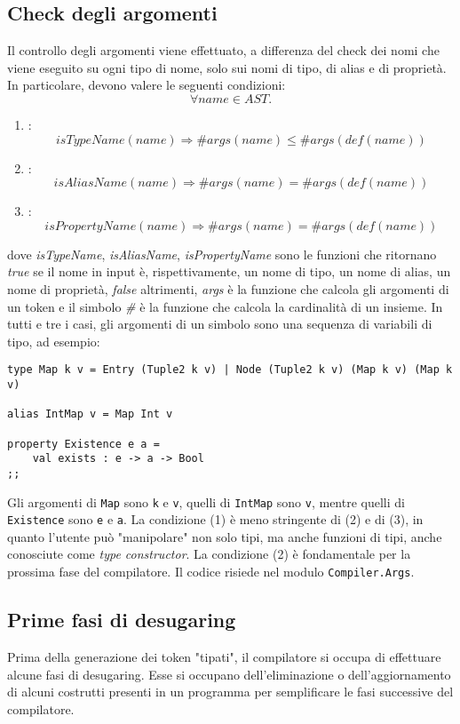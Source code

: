 \documentclass[10pt,a4paper]{article}
\begin{document}
\hypertarget{Check degli argomenti}{\subsection{Check degli argomenti}}
Il controllo degli argomenti viene effettuato, a differenza del check dei nomi che viene eseguito su ogni tipo di nome,
solo sui nomi di tipo, di alias e di proprietà. In particolare, devono valere le seguenti condizioni:
\[ \forall name \in AST. \]
\begin{enumerate}
    \item:
        \[ isTypeName(name) \Longrightarrow \#args(name) \leq \#args(def(name)) \]
    \item:
        \[ isAliasName(name) \Longrightarrow \#args(name) = \#args(def(name)) \]
    \item:
        \[ isPropertyName(name) \Longrightarrow \#args(name) = \#args(def(name)) \]
\end{enumerate}
dove \textit{isTypeName}, \textit{isAliasName}, \textit{isPropertyName} sono le funzioni che ritornano \textit{true}
se il nome in input è, rispettivamente, un nome di tipo, un nome di alias, un nome di proprietà, \textit{false} altrimenti,
\textit{args} è la funzione che calcola gli argomenti di un token e il simbolo \textit{\#} è la funzione che calcola
la cardinalità di un insieme. In tutti e tre i casi, gli argomenti di un simbolo sono una sequenza di variabili di tipo,
ad esempio:
\begin{lstlisting}
type Map k v = Entry (Tuple2 k v) | Node (Tuple2 k v) (Map k v) (Map k v)

alias IntMap v = Map Int v

property Existence e a =
    val exists : e -> a -> Bool
;;
\end{lstlisting}
Gli argomenti di \texttt{Map} sono \texttt{k} e \texttt{v}, quelli di \texttt{IntMap} sono \texttt{v}, mentre quelli di
\texttt{Existence} sono \texttt{e} e \texttt{a}.
La condizione (1) è meno stringente di (2) e di (3),
in quanto l'utente può "manipolare" non solo tipi, ma anche funzioni di tipi,
anche conosciute come \textit{type constructor}. La condizione (2) è fondamentale per la prossima fase del compilatore.
Il codice risiede nel modulo \texttt{Compiler.Args}.

\hypertarget{Prime fasi di desugaring}{\subsection{Prime fasi di desugaring}}
Prima della generazione dei token "tipati", il compilatore si occupa di effettuare alcune fasi di desugaring. Esse si
occupano dell'eliminazione o dell'aggiornamento di alcuni costrutti presenti in un programma per semplificare le fasi
successive del compilatore.
\end{document}
